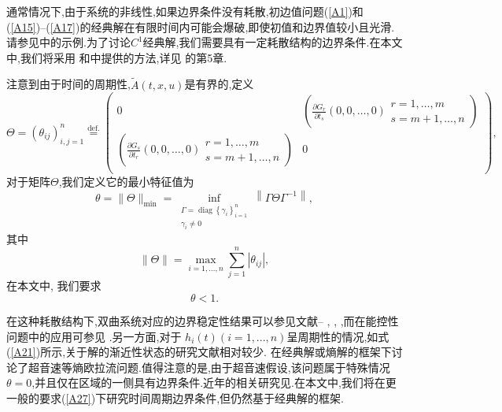 \documentclass[notitlepage,cs4size,punct,oneside]{ctexrep}
\numberwithin{equation}{chapter}
\theoremstyle{mystyle}
\begin{document}
通常情况下,由于系统的非线性,如果边界条件没有耗散,初边值问题(\ref{A1})和(\ref{A15})--(\ref{A17})的经典解在有限时间内可能会爆破,即使初值和边界值较小且光滑.请参见\cite{14}中的示例.为了讨论$ C^{1} $经典解,我们需要具有一定耗散结构的边界条件.在本文中,我们将采用\cite{18} 和\cite{23}中提供的方法,详见\cite{14} 的第5章.

注意到由于时间的周期性,$\tilde{A}(t,x,u)$是有界的,定义
\begin{equation}\label{A24}
    \Theta=(\theta _{i j})_{i,j=1} ^{n}\overset{\text{def.}}{=}
    \left(
    \begin{array}{cc}
            0 & \left( \frac{\partial G_r}{\partial t_s}(0,0,\dots,0)\substack{ r=1,\dots,m \\ s=m+1,\dots,n} \right) \\
            \left( \frac{\partial G_s}{\partial t_r}(0,0,\dots,0)\substack{ r=1,\dots,m     \\ s=m+1,\dots,n} \right) & 0 \\
        \end{array}
    \right),
\end{equation}
对于矩阵$\Theta$,我们定义它的最小特征值为
\begin{equation}\label{A25}
    \theta=\|\Theta\|_{\min }=\inf _{\substack{\Gamma=\operatorname{diag}\left\{\gamma_{i}\right\}_{i=1}^{n} \\ \gamma_{i} \neq 0}}\left\|\Gamma \Theta \Gamma^{-1}\right\|,
\end{equation}
其中
\begin{equation}\label{A26}
    \|\Theta\|=\max _{i=1, \ldots, n} \sum_{j=1}^{n}\left|\theta_{i j}\right|,
\end{equation}
在本文中, 我们要求
\begin{equation}\label{A27}
    \theta<1.
\end{equation}

在这种耗散结构下,双曲系统对应的边界稳定性结果可以参见文献\cite{1}-- \cite{11}, \cite{13}, \cite{16} ,而在能控性问题中的应用可参见\cite{20} .另一方面,对于 $h_{i}(t)(i = 1, ..., n)$呈周期性的情况,如式(\ref{A21})所示,关于解的渐近性状态的研究文献相对较少.\cite{22} 在经典解或熵解的框架下讨论了超音速等熵欧拉流问题.值得注意的是,由于超音速假设,该问题属于特殊情况$\theta  = 0$,并且仅在区域的一侧具有边界条件.近年的相关研究见\cite{24,25}.在本文中,我们将在更一般的要求(\ref{A27})下研究时间周期边界条件,但仍然基于经典解的框架.
\end{document}
